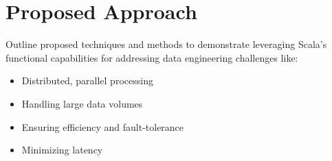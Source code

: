 \chapter{Proposed Approach}

Outline proposed techniques and methods to demonstrate leveraging Scala's functional capabilities for addressing data engineering challenges like:

\begin{itemize}
\item Distributed, parallel processing
\item Handling large data volumes
\item Ensuring efficiency and fault-tolerance
\item Minimizing latency
\end{itemize}